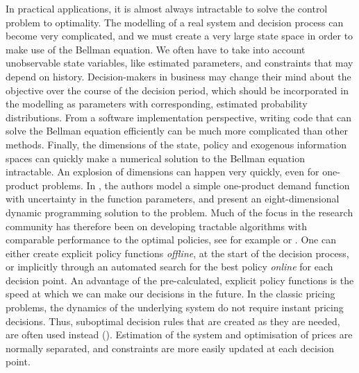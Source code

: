 \documentclass[main.tex]{subfiles}
\begin{document}
In practical applications, it is almost always
intractable to solve the control problem to optimality.
The modelling of a real system and decision process can become very
complicated, and  we must  create a very
large state space in order to make use of the Bellman equation.
We often have to take into account unobservable
state variables, like estimated parameters, and constraints
that may depend on history. Decision-makers in business may change their mind
about the objective over the course of the decision period, which should
be incorporated in the modelling as parameters with corresponding, estimated
probability distributions.
From a software implementation perspective, writing code that can
solve the Bellman equation efficiently can be much more complicated
than other methods.
Finally, the dimensions of the state, policy and exogenous
information spaces can quickly make a numerical solution to the Bellman
equation intractable. An explosion of dimensions can happen very
quickly, even for one-product problems. In
\citet{bertsimas2001dynamic}, the authors model a simple
one-product demand function with uncertainty in the function
parameters, and present an eight-dimensional dynamic programming
solution to the problem.
Much of the focus in the research community has therefore been on
developing tractable algorithms with comparable performance to the
optimal policies, see for example
\citet{powell2011approximate} or \citet{bertsekas2012dynamic}.
One can either create explicit policy functions \emph{offline}, at the
start of the decision process, or implicitly through an automated
search for the best policy \emph{online} for each decision point.
An advantage of the pre-calculated, explicit policy functions
is the speed at which we can make our decisions in the
future. In the classic pricing problems, the dynamics of the
underlying system do not require instant pricing decisions. Thus,
suboptimal decision rules that are created as they are needed, are often used
instead (\citet{talluri2006theory}). Estimation of the system and optimisation of prices are
normally separated, and constraints are more easily updated at each
decision point.
\end{document}
